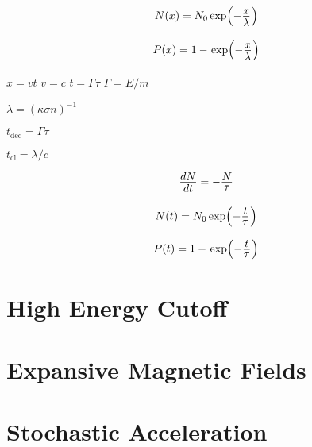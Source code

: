 \begin{equation*}
	N(x) = N_0 \exp \Bigl( -\frac{\raisebox{-0.5ex}{$x$}}{\raisebox{0.5ex}{$\lambda$}} \kern+0.5pt \Bigr)
\end{equation*}

\begin{equation*}
	P(x) = 1 - \kern+1.0pt \exp \Bigl( -\frac{\raisebox{-0.5ex}{$x$}}{\raisebox{0.5ex}{$\lambda$}} \kern+0.5pt \Bigr)
\end{equation*}

$x = vt$ $v = c$ $t = \Gamma\tau$ $\Gamma = E / m$

$\lambda = (\kappa \sigma n)^{-1}$

$t_\text{dec} = \Gamma\tau$

$t_\text{cl} = \lambda / c$

\begin{equation*}
	\frac{\raisebox{-0.5ex}{$dN$}}{\raisebox{0.5ex}{$dt$}} = -\frac{\raisebox{-0.5ex}{$N$}}{\raisebox{0.5ex}{$\tau$}}
\end{equation*}

\begin{equation*}
	N(t) = N_0 \exp \Bigl( -\frac{\raisebox{-0.5ex}{$t$}}{\raisebox{0.5ex}{$\tau$}} \kern+0.5pt \Bigr)
\end{equation*}

\begin{equation*}
	P(t) = 1 - \kern+1.0pt \exp \Bigl( -\frac{\raisebox{-0.5ex}{$t$}}{\raisebox{0.5ex}{$\tau$}} \kern+0.5pt \Bigr)
\end{equation*}



\section{High Energy Cutoff}
\label{sec:cutoff}



\section{Expansive Magnetic Fields}
\label{sec:fields}



\section{Stochastic Acceleration}
\label{sec:stochastic}

